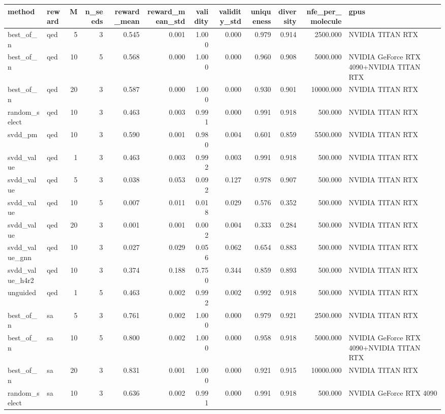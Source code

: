 \begin{tabular}{llrrrrrrrrrl}
\toprule
method & reward & M & n_seeds & reward_mean & reward_mean_std & validity & validity_std & uniqueness & diversity & nfe_per_molecule & gpus \\
\midrule
best_of_n & qed & 5 & 3 & 0.545 & 0.001 & 1.000 & 0.000 & 0.979 & 0.914 & 2500.000 & NVIDIA TITAN RTX \\
best_of_n & qed & 10 & 5 & 0.568 & 0.000 & 1.000 & 0.000 & 0.960 & 0.908 & 5000.000 & NVIDIA GeForce RTX 4090+NVIDIA TITAN RTX \\
best_of_n & qed & 20 & 3 & 0.587 & 0.000 & 1.000 & 0.000 & 0.930 & 0.901 & 10000.000 & NVIDIA TITAN RTX \\
random_select & qed & 10 & 3 & 0.463 & 0.003 & 0.991 & 0.000 & 0.991 & 0.918 & 500.000 & NVIDIA TITAN RTX \\
svdd_pm & qed & 10 & 3 & 0.590 & 0.001 & 0.980 & 0.004 & 0.601 & 0.859 & 5500.000 & NVIDIA TITAN RTX \\
svdd_value & qed & 1 & 3 & 0.463 & 0.003 & 0.992 & 0.003 & 0.991 & 0.918 & 500.000 & NVIDIA TITAN RTX \\
svdd_value & qed & 5 & 3 & 0.038 & 0.053 & 0.092 & 0.127 & 0.978 & 0.907 & 500.000 & NVIDIA TITAN RTX \\
svdd_value & qed & 10 & 5 & 0.007 & 0.011 & 0.018 & 0.029 & 0.576 & 0.352 & 500.000 & NVIDIA TITAN RTX \\
svdd_value & qed & 20 & 3 & 0.001 & 0.001 & 0.002 & 0.004 & 0.333 & 0.284 & 500.000 & NVIDIA TITAN RTX \\
svdd_value_gnn & qed & 10 & 3 & 0.027 & 0.029 & 0.056 & 0.062 & 0.654 & 0.883 & 500.000 & NVIDIA TITAN RTX \\
svdd_value_h4r2 & qed & 10 & 3 & 0.374 & 0.188 & 0.750 & 0.344 & 0.859 & 0.893 & 500.000 & NVIDIA TITAN RTX \\
unguided & qed & 1 & 5 & 0.463 & 0.002 & 0.992 & 0.002 & 0.992 & 0.918 & 500.000 & NVIDIA TITAN RTX \\
best_of_n & sa & 5 & 3 & 0.761 & 0.002 & 1.000 & 0.000 & 0.979 & 0.921 & 2500.000 & NVIDIA TITAN RTX \\
best_of_n & sa & 10 & 5 & 0.800 & 0.002 & 1.000 & 0.000 & 0.958 & 0.918 & 5000.000 & NVIDIA GeForce RTX 4090+NVIDIA TITAN RTX \\
best_of_n & sa & 20 & 3 & 0.831 & 0.001 & 1.000 & 0.000 & 0.921 & 0.915 & 10000.000 & NVIDIA TITAN RTX \\
random_select & sa & 10 & 3 & 0.636 & 0.002 & 0.991 & 0.000 & 0.991 & 0.918 & 500.000 & NVIDIA GeForce RTX 4090 \\

\end{tabular}
